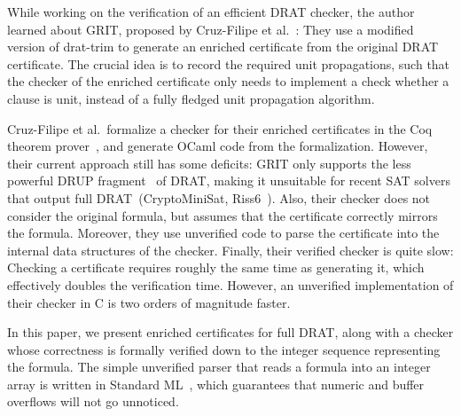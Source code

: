 \documentclass{llncs}
\begin{document}
While working on the verification of an efficient DRAT checker, the author learned about GRIT, proposed by Cruz-Filipe et al.~\cite{CMS17}: 
They use a modified version of drat-trim to generate an enriched certificate from the original DRAT certificate. 
The crucial idea is to record the required unit propagations, such that the checker of the enriched certificate only needs 
to implement a check whether a clause is unit, instead of a fully fledged unit propagation algorithm.

Cruz-Filipe et al.\ formalize a checker for their enriched certificates in the Coq theorem prover~\cite{BeCa10}, and generate OCaml code from the formalization. 
However, their current approach still has some deficits:
GRIT only supports the less powerful DRUP fragment~\cite{WHH13} of DRAT, making it unsuitable for recent SAT solvers that output full DRAT~(\eg CryptoMiniSat, Riss6~\cite{SATCOMP16}).
Also, their checker does not consider the original formula, but assumes that the certificate correctly mirrors the formula. 
Moreover, they use unverified code to parse the certificate into the internal data structures of the checker.
Finally, their verified checker is quite slow: Checking a certificate requires roughly the same time as generating it, which effectively doubles the verification time.
However, an unverified implementation of their checker in C is two orders of magnitude faster.

% 
% 

In this paper, we present enriched certificates for full DRAT, along with a checker whose correctness is formally verified down to the integer sequence 
representing the formula. 
The simple unverified parser that reads a formula into an integer array is written in Standard ML~\cite{MHMT97}, which guarantees that numeric and buffer overflows will 
not go unnoticed.
\end{document}
